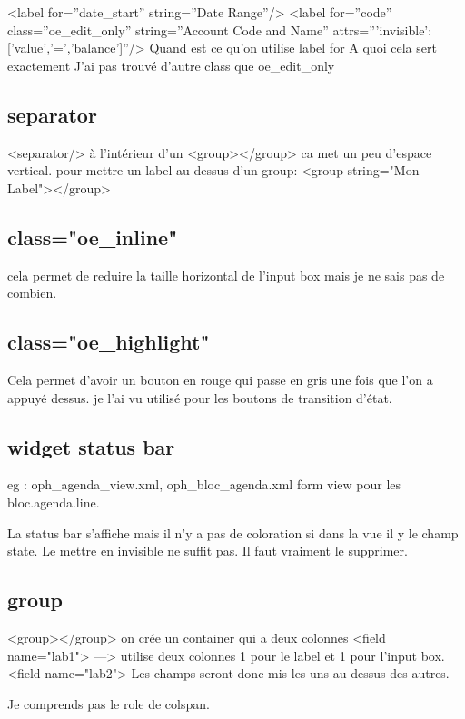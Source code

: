 \documentclass[12pt,a4paper]{article}
\begin{document}
<label for=''date\_start'' string=''Date Range''/>
<label for=''code'' class=''oe\_edit\_only'' string=''Account Code and Name'' attrs=''{'invisible':['value','=','balance']}''/>
Quand est ce qu'on utilise label for
A quoi cela sert exactement
J'ai pas trouvé d'autre class que oe\_edit\_only
\subsection{separator}
\label{sec:separator}

<separator/> à l'intérieur d'un <group></group> ca met un peu d'espace vertical.
pour mettre un label au dessus d'un group: <group string="Mon Label"></group>

\subsection{class="oe\_inline"}
\label{sec:oe_inline}

cela permet de reduire la taille horizontal de l'input box mais je ne sais pas de combien.

\subsection{class="oe\_highlight"}
\label{sec:highlight}

Cela permet d'avoir un bouton en rouge qui passe en gris une fois que l'on a appuyé dessus.
je l'ai vu utilisé pour les boutons de transition d'état.
\subsection{widget status bar }
\label{sec:statusbar}

eg : oph\_agenda\_view.xml, oph\_bloc\_agenda.xml form view pour les bloc.agenda.line.

La status bar s'affiche mais il n'y a pas de coloration si dans la vue il y le champ state.
Le mettre en invisible ne suffit pas. Il faut vraiment le supprimer. 

\subsection{group}
\label{sec:group_form}
<group></group> on crée un container qui a deux colonnes
<field name="lab1"> ---> utilise deux colonnes 1 pour le label et 1 pour l'input box. 
<field name="lab2">
Les champs seront donc mis les uns au dessus des autres. 

Je comprends pas le role de colspan. 
\end{document}
